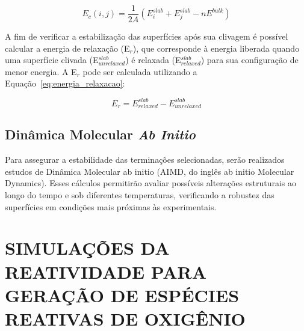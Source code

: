 \begin{equation}
E_{c}(i,j) = \frac{1}{2A} \left( E^{slab}_i + E^{slab}_j - nE^{bulk} \right)
\label{eq:energia_clivagem}
\end{equation}

\vspace{1em}

A fim de verificar a estabilização das superfícies após sua clivagem é possível calcular a energia de relaxação (E$_r$), que corresponde à energia liberada quando uma superfície clivada (E$_{unrelaxed}^{slab}$) é relaxada (E$_{relaxed}^{slab}$) para sua configuração de menor energia. A E$_r$ pode ser calculada utilizando a Equação~\ref{eq:energia_relaxacao}:

\begin{equation}
E_{r} = E_{relaxed}^{slab} - E_{unrelaxed}^{slab}
\label{eq:energia_relaxacao}
\end{equation}

\subsection{Dinâmica Molecular \textit{Ab Initio}}
Para assegurar a estabilidade das terminações selecionadas, serão 
realizados estudos de Dinâmica Molecular ab initio (AIMD, do inglês ab initio Molecular Dynamics). Esses cálculos permitirão avaliar possíveis alterações estruturais ao longo do tempo e sob diferentes temperaturas, verificando a robustez das superfícies em condições mais próximas às experimentais.

\section{SIMULAÇÕES DA REATIVIDADE PARA GERAÇÃO DE ESPÉCIES REATIVAS DE 
OXIGÊNIO}

